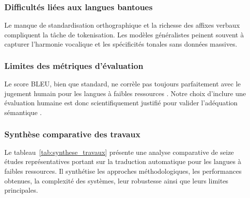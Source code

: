 \subsubsection{Difficultés liées aux langues bantoues}

Le manque de standardisation orthographique et la richesse des affixes verbaux compliquent la tâche de tokenisation. Les modèles généralistes peinent souvent à capturer l'harmonie vocalique et les spécificités tonales sans données massives.

\subsubsection{Limites des métriques d'évaluation}

Le score \ac{BLEU}, bien que standard, ne corrèle pas toujours parfaitement avec le jugement humain pour les langues à faibles ressources \cite{lankford2022human, lalrempuii2021improved}. Notre choix d'inclure une évaluation humaine est donc scientifiquement justifié pour valider l'adéquation sémantique \cite{tun2025exploring}.

\subsubsection{Synthèse comparative des travaux}

Le tableau~\ref{tab:synthese_travaux} présente une analyse comparative de seize études représentatives portant sur la traduction automatique pour les langues à faibles ressources. Il synthétise les approches méthodologiques, les performances obtenues, la complexité des systèmes, leur robustesse ainsi que leurs limites principales.

